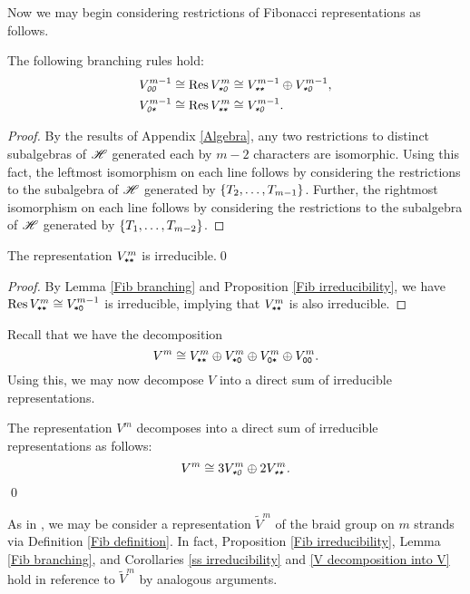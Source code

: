 \documentclass{amsart}
\begin{document}
Now we may begin considering restrictions of Fibonacci representations as follows.
\begin{lemma}\label{Fib branching}
  The following branching rules hold:
  \begin{align*}
    \emph{$V^{m-1}_{\texttt{0}\texttt{0}}$} \cong \emph{$\operatorname{Res} V_{\texttt{*}\texttt{0}}^m$} &\cong \emph{$V^{m-1}_{\texttt{*}\texttt{*}} \oplus V^{m-1}_{\texttt{*}\texttt{0}}$},\\
    \emph{$V_{\texttt{0}\texttt{*}}^{m-1} \cong \operatorname{Res} V_{\texttt{*}\texttt{*}}^m$} &\cong \emph{$V_{\texttt{*}\texttt{0}}^{m-1}$}.
  \end{align*}
\end{lemma}
\begin{proof}
  By the results of Appendix \ref{Algebra}, any two restrictions to distinct subalgebras of $\mathscr{H}$ generated each by $m-2$ characters are isomorphic.
  Using this fact, the leftmost isomorphism on each line follows by considering the restrictions to the subalgebra of $\mathscr{H}$ generated by $\left\{ T_2,\dots,T_{m-1} \right\}$.
  Further, the rightmost isomorphism on each line follows by considering the restrictions to the subalgebra of $\mathscr{H}$ generated by $\left\{ T_1,\dots,T_{m-2} \right\}$.
\end{proof}
\begin{corollary}\label{ss irreducibility}
  The representation \emph{$V^m_{\texttt{*}\texttt{*}}$} is irreducible.\qed
\end{corollary}
\begin{proof}
  By Lemma \ref{Fib branching} and Proposition \ref{Fib irreducibility}, we have $\operatorname{Res} V^m_{\texttt{*}\texttt{*}} \cong V^{m-1}_{\texttt{*}\texttt{0}}$ is irreducible, implying that $V^m_{\texttt{*}\texttt{*}}$ is also irreducible.
\end{proof}
Recall that we have the decomposition
\[
  V^m \cong V^m_{\texttt{*}\texttt{*}} \oplus V^m_{\texttt{*}\texttt{0}} \oplus V^m_{\texttt{0}\texttt{*}} \oplus V^m_{\texttt{0}\texttt{0}}.
\]
Using this, we may now decompose $V$ into a direct sum of irreducible representations.
\begin{corollary}\label{V decomposition into V}
  The representation $V^m$ decomposes into a direct sum of irreducible representations as follows:
  \[
    \emph{$V^m \cong 3V^m_{\texttt{*}\texttt{0}} \oplus 2V^m_{\texttt{*}\texttt{*}}$.}
  \]\qed
\end{corollary}

\begin{remark}
  As in \cite{Shor}, we may be consider a representation $\widetilde V^m$ of the braid group on $m$ strands via Definition \ref{Fib definition}. 
  In fact, Proposition \ref{Fib irreducibility}, Lemma \ref{Fib branching}, and Corollaries \ref{ss irreducibility} and \ref{V decomposition into V} hold in reference to $\widetilde V^m$ by analogous arguments.
\end{remark}
\end{document}
